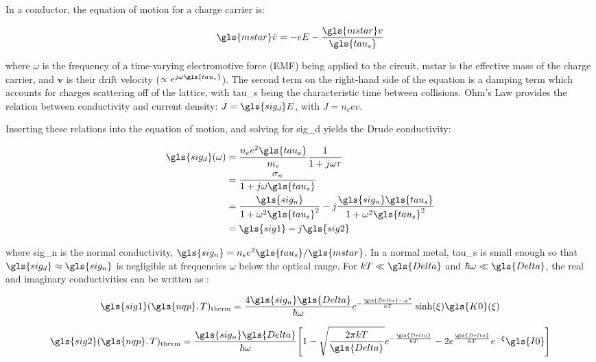 In a conductor, the equation of motion for a charge carrier is:

\begin{equation}
  \gls{mstar}\dot{v} = -eE - \frac{\gls{mstar}v}{\gls{tau_s}}
\end{equation}

where $\omega$ is the frequency of a time-varying electromotive force (EMF) being applied to the circuit, \gls{mstar} is the effective mass of the charge carrier, and $\boldsymbol{v}$ is their drift velocity ($\propto e^{j\omega\gls{tau_s}}$). The second term on the right-hand side of the equation is a damping term which accounts for charges scattering off of the lattice, with \gls{tau_s} being the characteristic time between collisions. Ohm's Law provides the relation between conductivity and current density: $J = \gls{sig_d} E$, with $J = n_{e}ev$.

Inserting these relations into the equation of motion, and solving for \gls{sig_d} yields the Drude conductivity:

\begin{equation}\label{eq:drude}
  \begin{aligned}
  \gls{sig_d}(\omega) &= \frac{n_{e}e^{2}\gls{tau_s}}{m_{e}}\frac{1}{1 + j\omega\tau} \\
                 &= \frac{\sigma_{n}}{1 + j\omega\gls{tau_s}} \\
                 &= \frac{\gls{sig_n}}{1 + \omega^{2}\gls{tau_s}^{2}} - j\frac{\gls{sig_n}\gls{tau_s}}{1 + \omega^{2}\gls{tau_s}^{2}} \\
                 &= \gls{sig1} - j\gls{sig2}
  \end{aligned}
\end{equation}

where \gls{sig_n} is the normal conductivity, $\gls{sig_n} = n_{e}e^{2}\gls{tau_s}/\gls{mstar}$. In a normal metal, \gls{tau_s} is small enough so that $\gls{sig_d} \approx \gls{sig_n}$ is negligible at frequencies $\omega$ below the optical range. For $kT \ll \gls{Delta}$ and $\hbar \omega \ll \gls{Delta}$, the real and imaginary conductivities can be written as \citep{gao2008physics}:

\begin{equation}
  \gls{sig1}(\gls{nqp}, T)_{\mathrm{therm}} = \frac{4\gls{sig_n}\gls{Delta}}{\hbar \omega}e^{-\frac{\gls{Delta} - \upmu^{*}}{kT}}\sinh(\xi)\gls{K0}(\xi)
\end{equation}

\begin{equation}
  \gls{sig2}(\gls{nqp}, T)_{\mathrm{therm}} = \frac{\gls{sig_n}\gls{Delta}}{\hbar \omega}\Bigg[ 1 - \sqrt{ \frac{ 2\pi kT }{ \gls{Delta} } } e^{-\frac{\gls{Delta}}{kT}}
   - 2e^{ \frac{\gls{Delta}}{kT}} e^{-\xi} \gls{I0} \Bigg]
\end{equation}

